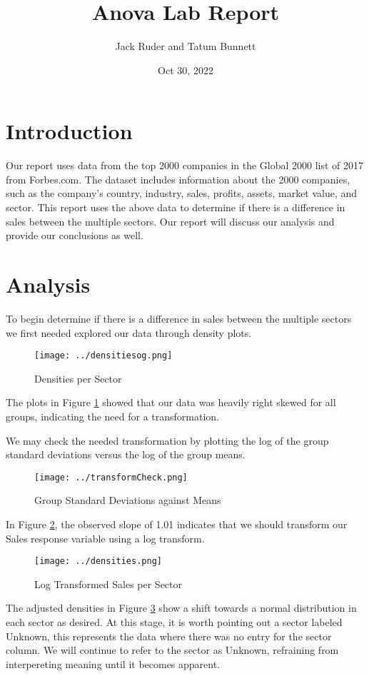 \documentclass[a4paper]{article}
\title{Anova Lab Report}
\date{Oct 30, 2022}
\author{Jack Ruder and Tatum Bunnett}
\begin{document}
\doublespacing
\maketitle

\section{Introduction}
Our report uses data from the top 2000 companies in the Global 2000 list of 2017 from Forbes.com. The dataset includes information about the 2000 companies, such as the company's country, industry, sales, profits, assets, market value, and sector. This report uses the above data to determine if there is a difference in sales between the multiple sectors. Our report will discuss our analysis and provide our conclusions as well.
\section{Analysis}%
\label{sec:Analysis}
To begin determine if there is a difference in sales between the multiple sectors we first needed explored our data through density plots.
\begin{figure}[H]
	\centering
	\texttt{[image: ../densitiesog.png]}
	\caption{Densities per Sector}
	\label{fig:densityplots}
\end{figure}
The plots in Figure \ref{fig:densityplots} showed that our data was heavily right skewed for all groups, indicating the need for a transformation.

We may check the needed transformation by plotting the log of the group standard deviations versus the log of the group means.

\begin{figure}[H]
	\centering
	\texttt{[image: ../transformCheck.png]}
	\caption{Group Standard Deviations against Means}
	\label{fig:transformcheck}
\end{figure}
In Figure \ref{fig:transformcheck}, the observed slope of 1.01 indicates that we should transform our Sales response variable using a log transform.

\begin{figure}[H]
	\centering
	\texttt{[image: ../densities.png]}
	\caption{Log Transformed Sales per Sector}
	\label{fig:densitiestr}
\end{figure}

The adjusted densities in Figure \ref{fig:densitiestr} show a shift towards a normal distribution in each sector as desired. At this stage, it is worth pointing out a sector labeled Unknown, this represents the data where there was no entry for the sector column. We will continue to refer to the sector as Unknown, refraining from interpereting meaning until it becomes apparent. \\
\end{document}
